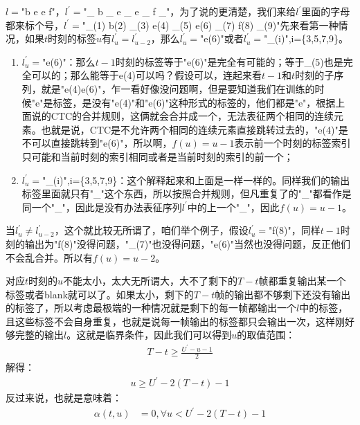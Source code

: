 $l=$"b e e f"，$l^{'}=$"\_ b \_ e \_ e \_ f \_"，为了说的更清楚，我们来给$l^{'}$里面的字母都来标个号，$l^{'}=$"\_(1) b(2) \_(3) e(4) \_(5) e(6) \_(7) f(8) \_(9)"先来看第一种情况，如果$t$时刻的标签$u$有$l_u^{'}=l_{u-2}^{'}$，那么$l_{u}^{'}=$"e(6)"或者$l_{u}^{'}=$"\_(i)",i=\{3,5,7,9\}。
\begin{enumerate}
  \item $l_{u}^{'}=$"e(6)"：那么$t-1$时刻的标签等于"e(6)"是完全有可能的；等于\_(5)也是完全可以的；那么能等于e(4)可以吗？假设可以，连起来看$t-1$和$t$时刻的子序列，就是"e(4)e(6)"，乍一看好像没问题啊，但是要知道我们在训练的时候"e"是标签，是没有"e(4)"和"e(6)"这种形式的标签的，他们都是"e"，根据上面说的CTC的合并规则，这俩就会合并成一个，无法表征两个相同的连续元素。也就是说，CTC是不允许两个相同的连续元素直接跳转过去的，"e(4)"是不可以直接跳转到"e(6)"，所以啊，$f(u)=u-1$表示前一个时刻的标签索引只可能和当前时刻的索引相同或者是当前时刻的索引的前一个；
  \item $l_{u}^{'}=$"\_(i)",i=\{3,5,7,9\}：这个解释起来和上面是一样一样的。同样我们的输出标签里面就只有"\_"这个东西，所以按照合并规则，但凡重复了的"\_"都看作是同一个"\_"，因此是没有办法表征序列$l^{'}$中的上一个"\_"，因此$f(u)=u-1$。
\end{enumerate}

当$l_u^{'} \ne l_{u-2}^{'}$，这个就比较无所谓了，咱们举个例子，假设$l_{u}^{'}=$"f(8)"，同样$t-1$时刻的输出为"f(8)"没得问题，"\_(7)"也没得问题，"e(6)"当然也没得问题，反正他们不会乱合并。所以有$f(u)=u-2$。

对应$t$时刻的$u$不能太小，太大无所谓大，大不了剩下的$T-t$帧都重复输出某一个标签或者blank就可以了。如果太小，剩下的$T-t$帧的输出都不够剩下还没有输出的标签了，所以考虑最极端的一种情况就是剩下的每一帧都输出一个$l$中的标签，且这些标签不会自身重复，也就是说每一帧输出的标签都只会输出一次，这样刚好够完整的输出$l$。这就是临界条件，因此我们可以得到$u$的取值范围：
\begin{align}
  T-t \ge \frac{U^{'}-u-1}{2}
\end{align}
解得：
\begin{align}
  u \ge U^{'}-2(T-t) - 1
\end{align}
反过来说，也就是意味着：
\begin{align}
  \alpha(t,u) &= 0, \forall u < U^{'}-2(T-t) - 1
\end{align}

